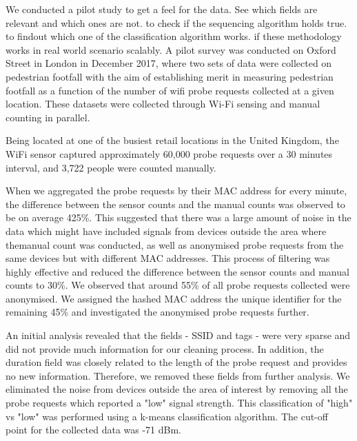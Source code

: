 We conducted a pilot study to get a feel for the data.
See which fields are relevant and which ones are not.
to check if the sequencing algorithm holds true.
to findout which one of the classification algorithm works.
if these methodology works in real world scenario scalably.
A pilot survey was conducted on Oxford Street in London in December 2017,
where two sets of data were collected on pedestrian footfall
with the aim of establishing merit in measuring pedestrian footfall
as a function of the number of wifi probe requests
collected at a given location.
These datasets were collected through Wi-Fi sensing and 
manual counting in parallel.

Being located at one of the busiest retail locations in the United Kingdom, the WiFi sensor captured approximately 60,000 probe requests over a 30 minutes interval, and 3,722 people were counted manually.

When we aggregated the probe requests by their MAC address for every minute, the difference between the sensor counts and the manual counts was observed to be on average 425\%.
This suggested that there was a large amount of noise in the data which might have included signals from devices outside the area where themanual count was conducted, as well as anonymised probe requests from the same devices but with different MAC addresses.
This process of filtering was highly effective and reduced the difference between the sensor counts and manual counts to 30\%.
We observed that around 55\% of all probe requests collected were anonymised.
We assigned the hashed MAC address the unique identifier for the remaining 45\% and investigated the anonymised probe requests further.

An initial analysis revealed that the fields - SSID and tags - were very sparse and did not provide much information for our cleaning process.
In addition, the duration field was closely related to the length of the probe request and provides no new information.
Therefore, we removed these fields from further analysis.
We eliminated the noise from devices outside the area of interest by removing all the probe requests which reported a "low" signal strength.
This classification of "high" vs "low" was performed using a k-means classification algorithm.
The cut-off point for the collected data was -71 dBm.

